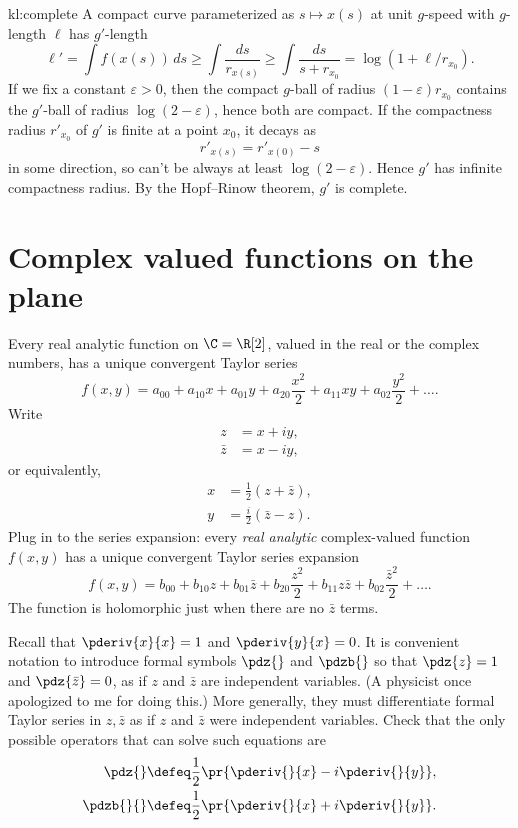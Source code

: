\begin{answer}{kl:complete}
A compact curve parameterized as \(s \mapsto x(s)\) at unit \(g\)-speed with \(g\)-length \(\ell\) has \(g'\)-length
\[
\ell'=
\int f(x(s)) \, ds
\ge
\int \frac{ds}{r_{x(s)}}
\ge
\int \frac{ds}{s+r_{x_0}}
=
\log(1+\ell/r_{x_0}).
\]
If we fix a constant \(\varepsilon > 0\), then the compact \(g\)-ball of radius \((1-\varepsilon)r_{x_0}\) contains the \(g'\)-ball of radius \(\log(2-\varepsilon)\), hence both are compact.
If the compactness radius \(r'_{x_0}\) of \(g'\) is finite at a point \(x_0\), it decays as 
\[
r'_{x(s)}=r'_{x(0)}-s
\]
in some direction, so can't be always at least \(\log(2-\varepsilon)\).
Hence \(g'\) has infinite compactness radius.
By the Hopf--Rinow theorem, \(g'\) is complete.
\end{answer}


\section{Complex valued functions on the plane}
Every real analytic function on \(\C=\R[2]\), valued in the real or the complex numbers, has a unique convergent Taylor series
\[
f(x,y)= a_{00} + a_{10} x + a_{01} y + a_{20} \frac{x^2}{2} + a_{11}xy + a_{02} \frac{y^2}{2} + \dots.
\]
Write 
\begin{align*}
z &= x+iy, \\
\bar{z} &= x-iy,
\end{align*}
or equivalently,
\begin{align*}
x &= \frac{1}{2}(z+\bar{z}), \\
y &=\frac{i}{2}(\bar{z}-z).
\end{align*}
Plug in to the series expansion: every \emph{real analytic} complex-valued function \(f(x,y)\) has a unique convergent Taylor series expansion
\[
f(x,y)= b_{00} + b_{10} z + b_{01} \bar{z} + b_{20} \frac{z^2}{2} + b_{11}z\bar{z} + b_{02} \frac{\bar{z}^2}{2} + \dots.
\]
The function is holomorphic just when there are no \(\bar{z}\) terms.

Recall that \(\pderiv{x}{x}=1\) and \(\pderiv{y}{x}=0\).
It is convenient notation to introduce formal symbols \(\pdz{}\) and \(\pdzb{}\) so that
\(\pdz{z}=1\) and \(\pdz{\bar{z}}=0\), as if \(z\) and \(\bar{z}\) are independent variables.
(A physicist once apologized to me for doing this.)
More generally, they must differentiate formal Taylor series in \(z,\bar{z}\) as if \(z\) and \(\bar{z}\) were independent variables.
Check that the only possible operators that can solve such equations are
\begin{align*}
\pdz{}&\defeq\frac{1}{2}\pr{\pderiv{}{x}-i\pderiv{}{y}}, \\
\pdzb{}{}&\defeq\frac{1}{2}\pr{\pderiv{}{x}+i\pderiv{}{y}}.
\end{align*}

